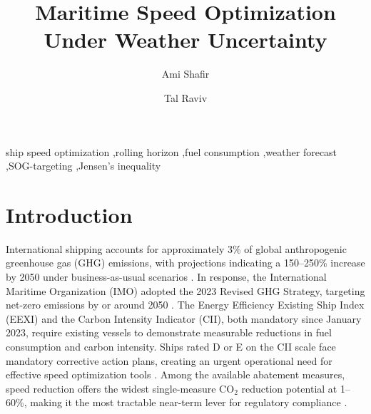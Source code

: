 \documentclass[review]{elsarticle}
\begin{document}
\begin{frontmatter}

\title{Maritime Speed Optimization Under Weather Uncertainty}

\author[tau]{Ami Shafir}
\author[tau]{Tal Raviv}
\address[tau]{Faculty of Engineering, Tel Aviv University, Tel Aviv, Israel}

\begin{abstract}
\end{abstract}

\begin{keyword}
ship speed optimization \sep rolling horizon \sep fuel consumption \sep weather forecast \sep SOG-targeting \sep Jensen's inequality
\end{keyword}

\end{frontmatter}

\section{Introduction}
\label{sec:introduction}

International shipping accounts for approximately 3\% of global anthropogenic greenhouse gas (GHG) emissions, with projections indicating a 150--250\% increase by 2050 under business-as-usual scenarios \cite{Bouman2017}. In response, the International Maritime Organization (IMO) adopted the 2023 Revised GHG Strategy, targeting net-zero emissions by or around 2050 \cite{Tadros2023}. The Energy Efficiency Existing Ship Index (EEXI) and the Carbon Intensity Indicator (CII), both mandatory since January 2023, require existing vessels to demonstrate measurable reductions in fuel consumption and carbon intensity. Ships rated D or E on the CII scale face mandatory corrective action plans, creating an urgent operational need for effective speed optimization tools \cite{Tadros2023}. Among the available abatement measures, speed reduction offers the widest single-measure CO$_2$ reduction potential at 1--60\%, making it the most tractable near-term lever for regulatory compliance \cite{Bouman2017}.
\end{document}
